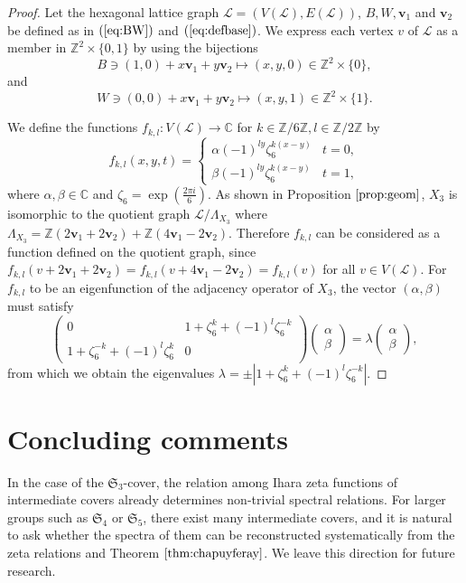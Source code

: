 \documentclass[lualatex,12pt]{article}
\begin{document}
\begin{proof}
 Let the hexagonal lattice graph 
 ${\mathcal L} = (V({\mathcal L}), E({\mathcal L}))$,
 $B, W, {\mathbf v}_1$ and ${\mathbf v}_2$
 be defined as in $(\ref{eq:BW})$ and $(\ref{eq:defbase})$.
 We express each vertex $v$ of ${\mathcal L}$ as
 a member in  ${\mathbb Z}^2\times\{0,1\}$ by using the bijections
 \[
 B \ni (1,0) + x{\mathbf v}_1 + y{\mathbf v}_2 \mapsto (x,y,0) \in {\mathbb Z}^2\times\{0\},
 \]
 and
 \[
 W \ni (0,0) + x{\mathbf v}_1 + y{\mathbf v}_2 \mapsto (x,y,1) \in {\mathbb Z}^2\times\{1\}.
 \]
 
 We define  the functions $f_{k,l}:V({\mathcal L}) \to {\mathbb C}$ for
 $k\in {\mathbb Z}/6{\mathbb Z}, l\in {\mathbb Z}/2{\mathbb Z}$ by
 \[
  f_{k,l}(x,y,t) = \begin{cases}
		    \alpha (-1)^{ly}\zeta_6^{k(x-y)} & t = 0,\\
		    \beta (-1)^{ly}\zeta_6^{k(x-y)} & t = 1,
		   \end{cases}
 \]
 where $\alpha, \beta \in {\mathbb C}$ and $\zeta_6 = \exp\left(\frac{2\pi i}{6}\right)$.
 As shown in Proposition $\ref{prop:geom}$, $X_3$ is isomorphic to the quotient graph
 ${\mathcal L}/\Lambda_{X_3}$ where $\Lambda_{X_3} = {\mathbb Z}(2{\mathbf v}_1 + 2{\mathbf v}_2) + {\mathbb Z}(4{\mathbf v}_1-2{\mathbf v}_2)$.
 Therefore $f_{k,l}$ can be considered as a function defined on the
 quotient graph, since
 $f_{k,l}(v+2{\mathbf v}_1 + 2{\mathbf v}_2)=f_{k,l}(v+4{\mathbf v}_1-2{\mathbf v}_2)=f_{k,l}(v)$
 for all $v\in V({\mathcal L})$.
 For $f_{k,l}$ to be an eigenfunction of the adjacency operator
 of $X_3$, the vector $(\alpha,\beta)$ must satisfy 
 \[
 \begin{pmatrix}
  0 & 1 + \zeta_6^k + (-1)^l\zeta_6^{-k} \\
  1 + \zeta_6^{-k} + (-1)^l\zeta_6^{k} & 0
 \end{pmatrix}
 \begin{pmatrix}
  \alpha \\ \beta
 \end{pmatrix}
 =
 \lambda
 \begin{pmatrix}
  \alpha \\ \beta
 \end{pmatrix},
 \]
 from which we obtain the
 eigenvalues $\lambda = \pm \left|1 + \zeta_6^k + (-1)^l\zeta_6^{-k}\right|$.
\end{proof}




\section{Concluding comments}
In the case of the ${\mathfrak S}_3$-cover, 
the relation among Ihara zeta functions of intermediate covers already 
determines non-trivial spectral relations. 
For larger groups such as ${\mathfrak S}_4$ or ${\mathfrak S}_5$,
there exist many intermediate covers, 
and it is natural to ask whether the spectra of 
them can be reconstructed systematically 
from the zeta relations and Theorem $\ref{thm:chapuyferay}$. 
We leave this direction for future research.
\end{document}
